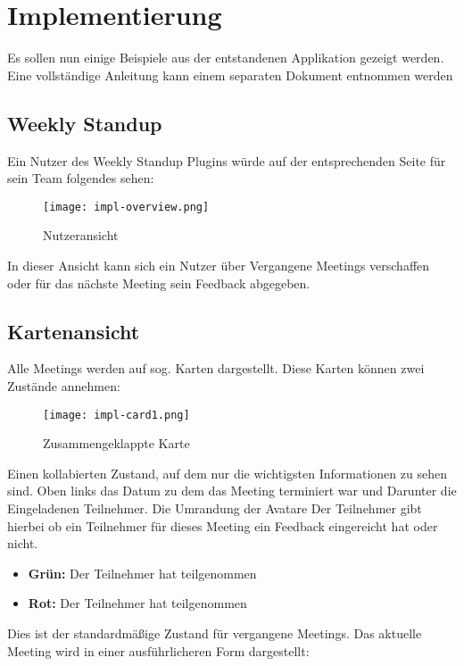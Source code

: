 \chapter{Implementierung}

Es sollen nun einige Beispiele aus der entstandenen Applikation gezeigt werden. Eine vollständige Anleitung kann einem separaten Dokument entnommen werden

\section{Weekly Standup}

Ein  Nutzer des Weekly Standup Plugins würde auf der entsprechenden Seite für sein Team folgendes sehen:

\begin{figure}[H]
	\centering
	\texttt{[image: impl-overview.png]}
    \caption{Nutzeransicht}
	\label{fig:userview}
\end{figure}

In dieser Ansicht kann sich ein Nutzer über Vergangene Meetings verschaffen oder für das nächste Meeting sein Feedback abgegeben.

\section{Kartenansicht}

Alle Meetings werden auf sog. Karten dargestellt. Diese Karten können zwei Zustände annehmen: 
\begin{figure}[H]
	\centering
	\texttt{[image: impl-card1.png]}
    \caption{Zusammengeklappte Karte}
	\label{fig:collapsedCard}
\end{figure}

Einen kollabierten Zustand, auf dem nur die wichtigsten Informationen zu sehen sind. Oben links das Datum zu dem das Meeting terminiert war und Darunter die Eingeladenen Teilnehmer.
Die Umrandung der Avatare Der Teilnehmer gibt hierbei ob ein Teilnehmer für dieses Meeting ein Feedback eingereicht hat oder nicht. 
\begin{itemize}
\item \textbf{Grün:} Der Teilnehmer hat teilgenommen
\item \textbf{Rot:} Der Teilnehmer hat \textbf{}teilgenommen
\end{itemize}
Dies ist der standardmäßige Zustand für vergangene Meetings. Das aktuelle Meeting wird in einer ausführlicheren Form dargestellt:

